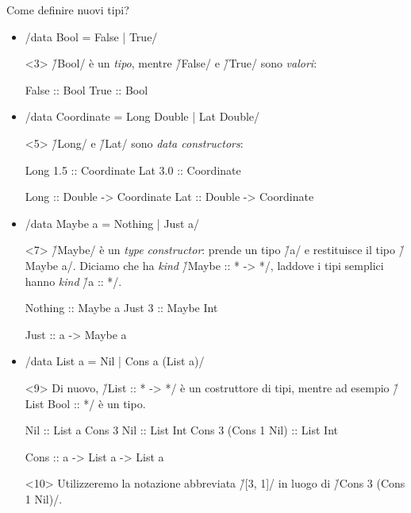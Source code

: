 \begin{frame}[fragile]{\secname}{Come definire nuovi tipi?}
\begin{overlayarea}{\textwidth}{0.7\textheight}
\begin{itemize}
\item<2-> \haskell/data Bool = False | True/

\begin{onlyenv}<3>
\vspace{0.2cm}
\h/Bool/ è un \emph{tipo}, mentre \h/False/ e \h/True/ sono \emph{valori}:

\begin{haskellcode}
False :: Bool
True  :: Bool
\end{haskellcode}
\end{onlyenv}

\item<4-> \haskell/data Coordinate = Long Double | Lat Double/
\begin{onlyenv}<5>
\h/Long/ e \h/Lat/ sono \emph{data constructors}:

\begin{haskellcode}
Long 1.5 :: Coordinate
Lat 3.0  :: Coordinate

Long :: Double -> Coordinate
Lat  :: Double -> Coordinate
\end{haskellcode}
\end{onlyenv}
\item<6-> \haskell/data Maybe a = Nothing | Just a/
\begin{onlyenv}<7>
\h/Maybe/ è un \emph{type constructor}: prende un tipo \h/a/ e restituisce il tipo \h/Maybe a/. Diciamo che ha \emph{kind} \h/Maybe :: * -> */, laddove i tipi semplici hanno \emph{kind} \h/a :: */.

\begin{haskellcode}
Nothing :: Maybe a
Just 3  :: Maybe Int

Just :: a -> Maybe a
\end{haskellcode}
\end{onlyenv}
\item<8-> \haskell/data List a = Nil | Cons a (List a)/
\begin{onlyenv}<9>
Di nuovo, \h/List :: * -> */ è un costruttore di tipi, mentre ad esempio \h/List Bool :: */ è un tipo.

\begin{haskellcode}
Nil                 :: List a
Cons 3 Nil          :: List Int
Cons 3 (Cons 1 Nil) :: List Int

Cons :: a -> List a -> List a
\end{haskellcode}
\end{onlyenv}
\begin{onlyenv}<10>
Utilizzeremo la notazione abbreviata \h/[3, 1]/ in luogo di \h/Cons 3 (Cons 1 Nil)/.
\end{onlyenv}
\end{itemize}
\end{overlayarea}

\end{frame}

